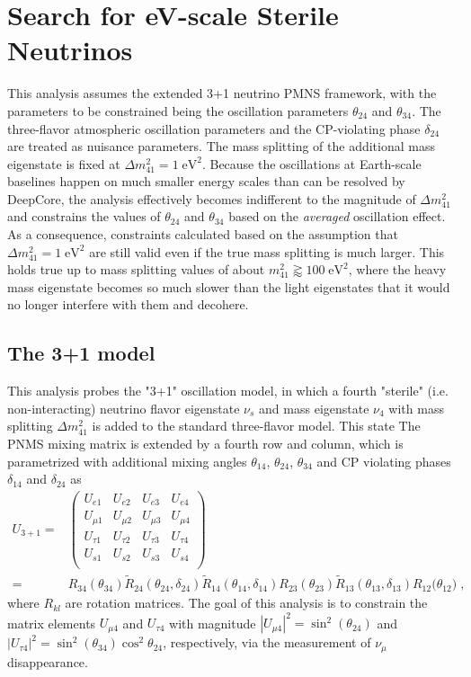 \section{Search for eV-scale Sterile Neutrinos}
\label{sec:sterile-measurement}

This analysis assumes the extended 3+1 neutrino PMNS framework, with the parameters to be constrained being the oscillation parameters $\theta_{24}$ and $\theta_{34}$. The three-flavor atmospheric oscillation parameters and the CP-violating phase $\delta_{24}$ are treated as nuisance parameters. The mass splitting of the additional mass eigenstate is fixed at $\Delta m^2_{41}=1\;\mathrm{eV^2}$. Because the oscillations at Earth-scale baselines happen on much smaller energy scales than can be resolved by DeepCore, the analysis effectively becomes indifferent to the magnitude of $\Delta m^2_{41}$ and constrains the values of $\theta_{24}$ and $\theta_{34}$ based on the \emph{averaged} oscillation effect. As a consequence, constraints calculated based on the assumption that $\Delta m^2_{41}=1\;\mathrm{eV^2}$ are still valid even if the true mass splitting is much larger. This holds true up to mass splitting values of about $m^2_{41}\gtrapprox100\;\mathrm{eV^2}$, where the heavy mass eigenstate becomes so much slower than the light eigenstates that it would no longer interfere with them and decohere.

\subsection{The 3+1 model}
This analysis probes the "3+1" oscillation model, in which a fourth "sterile" (i.e. non-interacting) neutrino flavor eigenstate $\nu_s$ and mass eigenstate $\nu_4$ with mass splitting $\Delta m^2_{41}$ is added to the standard three-flavor model. This state The PNMS mixing matrix is extended by a fourth row and column, which is parametrized with additional mixing angles $\theta_{14}$, $\theta_{24}$, $\theta_{34}$ and CP violating phases $\delta_{14}$ and $\delta_{24}$ as
\begin{align*}
    U_{3+1} =&\begin{pmatrix}
    U_{e1}    & U_{e2}    & U_{e3}   &U_{e4}    \\
    U_{\mu1}  & U_{\mu2}  & U_{\mu3} &U_{\mu4}  \\
    U_{\tau1} & U_{\tau2} & U_{\tau3}&U_{\tau4} \\
    U_{s1} & U_{s2} & U_{s3}&U_{s4} \\
    \end{pmatrix}\\
    =&
    R_{34}(\theta_{34})
    \tilde{R}_{24}(\theta_{24}, \delta_{24})
    \tilde{R}_{14}(\theta_{14}, \delta_{14})
    R_{23}(\theta_{23})
    \tilde{R}_{13}(\theta_{13}, \delta_{13})
    R_{12}({\theta_{12})}\;,
\end{align*}
where $R_{kl}$ are rotation matrices. The goal of this analysis is to constrain the matrix elements $U_{\mu4}$ and $U_{\tau4}$ with magnitude $|U_{\mu4}|^2=\sin^2(\theta_{24})$ and  $|U_{\tau4}|^2=\sin^2(\theta_{34})\cos^2\theta_{24}$, respectively, via the measurement of $\nu_\mu$ disappearance.


